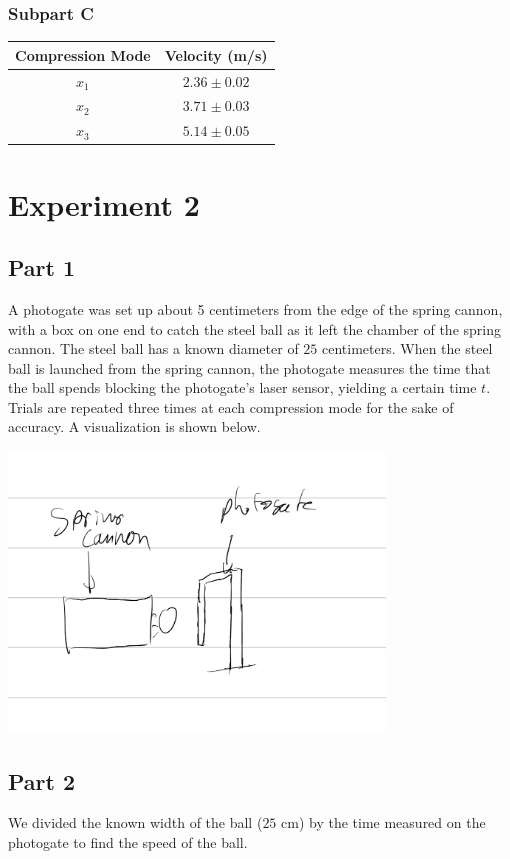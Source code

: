 \documentclass[8pt]{extarticle}
\begin{document}
{\subsubsection*{Subpart C}
\begin{center}
	\renewcommand{\arraystretch}{1.5}
	\begin{tabular}{c|c}
		Compression Mode & Velocity (m/s) \\
		\hline
		$x_1$ & $2.36\pm 0.02$ \\
		$x_2$ & $3.71\pm 0.03$ \\
		$x_3$ & $5.14 \pm 0.05$
	\end{tabular}
\end{center}
\section*{Experiment 2}
\subsection*{Part 1}
A photogate was set up about 5 centimeters from the edge of the spring cannon, with a box on one end to catch the steel ball as it left the chamber of the spring cannon. The steel ball has a known diameter of $25$ centimeters. When the steel ball is launched from the spring cannon, the photogate measures the time that the ball spends blocking the photogate's laser sensor, yielding a certain time $t$. Trials are repeated three times at each compression mode for the sake of accuracy. A visualization is shown below.
\begin{center}
	\includegraphics[width=10cm]{Lab7Image2}
\end{center}
\subsection*{Part 2}
We divided the known width of the ball ($25$ cm) by the time measured on the photogate to find the speed of the ball.
}
\end{document}
